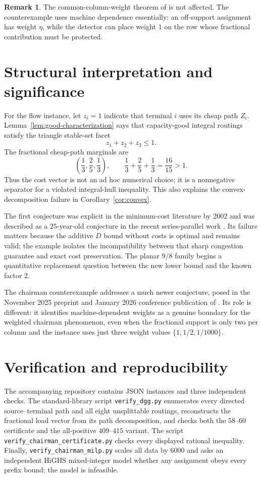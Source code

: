 \documentclass[11pt]{article}
\theoremstyle{definition}
\newtheorem{remark}[theorem]{Remark}
\begin{document}
\begin{remark}
The common-column-weight theorem of \citet{LiuReis2026} is not affected.  The
counterexample uses machine dependence essentially: an off-support assignment
has weight $\eta$, while the detector can place weight $1$ on the row whose
fractional contribution must be protected.
\end{remark}

\section{Structural interpretation and significance}

For the flow instance, let $z_i=1$ indicate that terminal $i$ uses its cheap
path $Z_i$.  Lemma~\ref{lem:good-characterization} says that capacity-good
integral routings satisfy the triangle stable-set facet
\[
 z_1+z_2+z_3\le1.
\]
The fractional cheap-path marginals are
\[
 \left(\frac13,\frac25,\frac13\right),
 \qquad
 \frac13+\frac25+\frac13=\frac{16}{15}>1.
\]
Thus the cost vector is not an ad hoc numerical choice; it is a nonnegative
separator for a violated integral-hull inequality.  This also explains the
convex-decomposition failure in Corollary~\ref{cor:convex}.

The first conjecture was explicit in the minimum-cost literature by 2002 and
was described as a $25$-year-old conjecture in the recent series-parallel work
\cite{AlmoghrabiSkutellaWarode2026}.  Its failure matters because the additive
$D$ bound without costs is optimal and remains valid; the example isolates the
incompatibility between that sharp congestion guarantee and exact cost
preservation.  The planar $9/8$ family begins a quantitative replacement
question between the new lower bound and the known factor $2$.

The chairman counterexample addresses a much newer conjecture, posed in the
November 2025 preprint and January 2026 conference publication of
\citet{LiuReis2026}.  Its role is different: it identifies machine-dependent
weights as a genuine boundary for the weighted chairman phenomenon, even when
the fractional support is only two per column and the instance uses just three
weight values $\{1,1/2,1/1000\}$.

\section{Verification and reproducibility}

The accompanying repository contains JSON instances and three independent
checks.  The standard-library script \texttt{verify\_dgg.py} enumerates every
directed source--terminal path and all eight unsplittable routings, reconstructs
the fractional load vector from its path decomposition, and checks both the
$58$--$60$ certificate and the all-positive $409$--$415$ variant.
The script \texttt{verify\_chairman\_certificate.py} checks every displayed
rational inequality.  Finally, \texttt{verify\_chairman\_milp.py} scales all
data by $6000$ and asks an independent HiGHS mixed-integer model whether any
assignment obeys every prefix bound; the model is infeasible.
\end{document}
